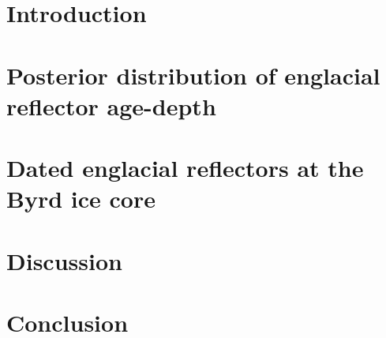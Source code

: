 \documentclass[draft,jgrga]{statclim}
\begin{document}

\begin{abstract}
  
\end{abstract}

%
%

%

\begin{article}

%
%

\section{Introduction}\label{intro}
	

\section{Posterior distribution of englacial reflector age-depth}\label{byrdchronology}
	
	
	\label{radardepth}
	
	
\section{Dated englacial reflectors at the Byrd ice core}\label{agedepthresults}
	

\section{Discussion}\label{discussion}
	
	
\section{Conclusion}\label{conclusion}
	




\end{article}
\end{document}
